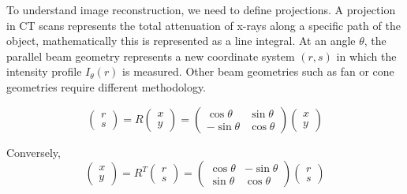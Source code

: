 \documentclass{article}
\theoremstyle{definition}
\begin{document}
To understand image reconstruction, we need to define projections. A projection in CT scans represents the total attenuation of x-rays along a specific path of the object, mathematically this is represented as a line integral. At an angle $\theta$, the parallel beam geometry represents a new coordinate system $(r, s)$ in which the intensity profile $I_\theta (r)$ is measured. Other beam geometries such as fan or cone geometries require different methodology.

$$\begin{pmatrix} r \\ s \end{pmatrix} = R \begin{pmatrix} x \\ y \end{pmatrix} = \begin{pmatrix} \cos\theta & \sin\theta \\ -\sin\theta & \cos\theta \end{pmatrix} \begin{pmatrix} x \\ y \end{pmatrix}$$

Conversely,
$$\begin{pmatrix} x \\ y \end{pmatrix} = R^T \begin{pmatrix} r \\ s \end{pmatrix} = \begin{pmatrix} \cos\theta & -\sin\theta \\ \sin\theta & \cos\theta \end{pmatrix} \begin{pmatrix} r \\ s \end{pmatrix}$$
\end{document}
